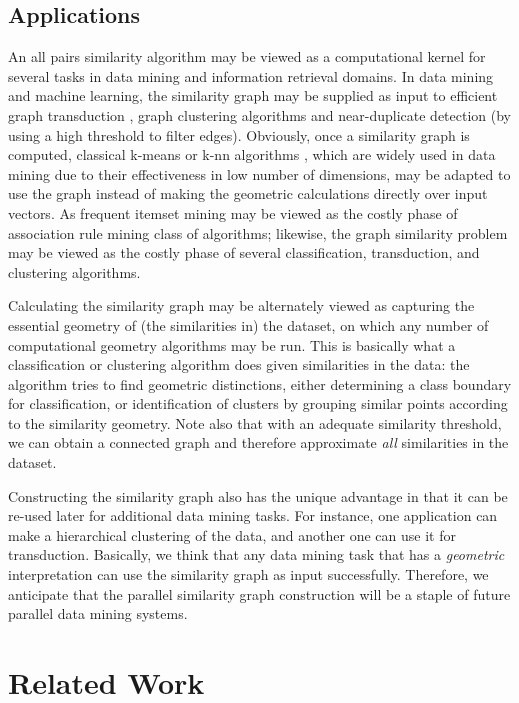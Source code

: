 \documentclass{comjnl}
\begin{document}
\subsection{Applications}

An all pairs similarity algorithm may be viewed as a computational
kernel for several tasks in data mining and information retrieval
domains.  In data mining and machine learning, the similarity graph
 may be supplied as input to efficient graph
transduction \cite{Joachims03transductive, Wang08graph}, graph
clustering algorithms \cite{brandes2003} and near-duplicate detection
(by using a high threshold to filter edges). Obviously, once a
similarity graph is computed, classical k-means
\cite{macqueen67,lloyd57} or k-nn algorithms \cite{fix51,cover67},
which are widely used in data mining due to their effectiveness in low
number of dimensions, may be adapted to use the graph instead of
making the geometric calculations directly over input vectors.  As
frequent itemset mining may be viewed as the costly phase of
association rule mining class of algorithms; likewise, the graph
similarity problem may be viewed as the costly phase of several
classification, transduction, and clustering algorithms. 

Calculating
the similarity graph may be alternately viewed as capturing the
essential geometry of (the similarities in) the dataset, on which any
number of computational geometry algorithms may be run. This is
basically what a classification or clustering algorithm does given
similarities in the data: the algorithm tries to find geometric
distinctions, either determining a class boundary for classification,
or identification of clusters by grouping similar points according to
the similarity geometry.  Note also that with an adequate similarity
threshold, we can obtain a connected graph and therefore approximate
\emph{all} similarities in the dataset.  

Constructing the similarity
graph also has the unique advantage in that it can be re-used later
for additional data mining tasks. For instance, one application can
make a hierarchical clustering of the data, and another one can use it
for transduction. Basically, we think that any data mining task that
has a \emph{geometric} interpretation can use the similarity graph as
input successfully. Therefore, we anticipate that the parallel
similarity graph construction will be a staple of future parallel data
mining systems.

\section{Related Work}
\label{sec:relatedwork}
\end{document}
